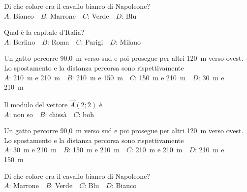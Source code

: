 \def\mcquestionnumber{10}


\mcquestionheader Di che colore era il cavallo bianco di Napoleone?\\
{$A$}: Bianco\ \ {$B$}: Marrone\ \ {$C$}: Verde\ \ {$D$}: Blu\ \ 

\mcquestionfooter



\def\mcquestionnumber{11}


\mcquestionheader Qual è la capitale d’Italia?\\
{$A$}: Berlino\ \ {$B$}: Roma\ \ {$C$}: Parigi\ \ {$D$}: Milano\ \ 

\mcquestionfooter



\def\mcquestionnumber{12}


\mcquestionheader Un gatto percorre 90,0~m verso sud e poi prosegue per altri 120~m verso ovest. Lo spostamento e la distanza percorsa sono rispettivamente\\
{$A$}: 210~m e 210~m\ \ {$B$}: 210~m e 150~m\ \ {$C$}: 150~m e 210~m\ \ {$D$}: 30~m e 210~m\ \ 

\mcquestionfooter



\mcpaperfooter

\def\mcserialnumber{38}
\mcpaperheader


\def\mcquestionnumber{1}


\mcquestionheader Il modulo del vettore $\vec{A}(2;2)$ è\\
{$A$}: non so\ \ {$B$}: chissà\ \ {$C$}: boh\ \ 

\mcquestionfooter



\def\mcquestionnumber{2}


\mcquestionheader Un gatto percorre 90,0~m verso sud e poi prosegue per altri 120~m verso ovest. Lo spostamento e la distanza percorsa sono rispettivamente\\
{$A$}: 30~m e 210~m\ \ {$B$}: 150~m e 210~m\ \ {$C$}: 210~m e 210~m\ \ {$D$}: 210~m e 150~m\ \ 

\mcquestionfooter



\def\mcquestionnumber{3}


\mcquestionheader Di che colore era il cavallo bianco di Napoleone?\\
{$A$}: Marrone\ \ {$B$}: Verde\ \ {$C$}: Blu\ \ {$D$}: Bianco\ \ 

\mcquestionfooter



